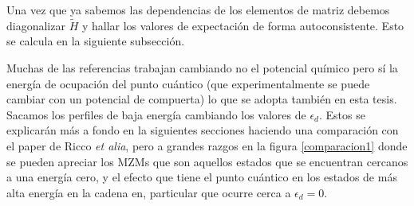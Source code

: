 Una vez que ya sabemos las dependencias de los elementos de matriz debemos diagonalizar $\tilde H$ y hallar los valores de expectaci\'{o}n de forma autoconsistente. Esto se calcula en la siguiente subsecci\'{o}n.
\par Muchas de las referencias trabajan cambiando no el potencial qu\'{i}mico pero s\'{i} la energ\'{i}a de ocupaci\'{o}n del punto cu\'{a}ntico (que experimentalmente se puede cambiar con un potencial de compuerta) lo que se adopta tambi\'{e}n en esta tesis. Sacamos los perfiles de baja energ\'{i}a cambiando los valores de $\epsilon_d$. Estos se explicar\'{a}n m\'{a}s a fondo en la siguientes secciones haciendo una comparaci\'{o}n con el paper de Ricco \emph{et alia}, pero a grandes razgos en la figura \ref{comparacion1} donde se pueden apreciar los MZMs que son aquellos estados que se encuentran cercanos a una energ\'{i}a cero, y el efecto que tiene el punto cu\'{a}ntico en los estados de m\'{a}s alta energ\'{i}a en la cadena en, particular que ocurre cerca a $\epsilon_d=0$. 
%
